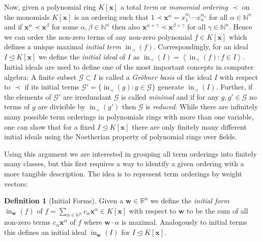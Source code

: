 \documentclass[
  paper=a4,
  titlepage,
  bibliography=totoc,
  listof=totoc,
  pagesize=pdftex
]{scrartcl}
\numberwithin{figure}{section}
\numberwithin{equation}{section}
\numberwithin{table}{section}
\newcommand*\setR{\mathds{R}}
\newcommand*\setN{\mathds{N}}
\newcommand*\ideal[1]{\left\langle #1 \right\rangle}
\let\vec\mathbf
\let\idealof\trianglelefteq
\DeclareMathOperator{\initial}{in}
\theoremstyle{definition}
\newtheorem{definition}{Definition}
\numberwithin{definition}{section}
\begin{document}
Now, given a polynomial ring $K[\vec x]$ a total \emph{term} or \emph{monomial ordering}
$\prec$ on the monomials $K[\vec x]$ is an ordering such that $1 \prec \vec x^\alpha =
x_1^{\alpha_1}\cdots x_n^{\alpha_n}$ for all $\alpha \in \setN^n$ and if $\vec x^\alpha
\prec \vec x^\beta$ for some $\alpha, \beta \in \setN^n$ then also $\vec x^{\alpha+\gamma}
\prec \vec x^{\beta+\gamma}$ for all $\gamma \in \setN^n$. Hence we can order the non-zero
terms of any non-zero polynomial $f \in K[\vec x]$ which defines a unique maximal
\emph{initial term} $\initial_\prec(f)$. Correspondingly, for an ideal $I \idealof K[\vec
x]$ we define the \emph{initial ideal} of $I$ as $\initial_\prec(I) = \ideal{\initial_\prec(f)
: f \in I}$. Initial ideals are used to define one of the most important concepts in
computer algebra: A finite subset $\mathcal G \subset I$ is called a \emph{Gröbner basis}
of the ideal $I$ with respect to $\prec$ if its initial terms $\mathcal G' = \{
\initial_\prec(g) : g \in \mathcal G \}$ generate $\initial_\prec(I)$. Further, if the
elements of $\mathcal G'$ are irredundant $\mathcal G$ is called \emph{minimal} and if for
any $g, g' \in \mathcal G$ no terms of $g$ are divisible by $\initial_\prec(g')$ then
$\mathcal G$ is \emph{reduced}. While there are infinitely many possible term orderings in
polynomials rings with more than one variable, one can show that for a fixed $I \idealof
K[\vec x]$ there are only finitely many different initial ideals using the Noetherian
property of polynomial rings over fields.

Using this argument we are interested in grouping all term orderings into finitely many
classes, but this first requires a way to identify a given ordering with a more tangible
description. The idea is to represent term orderings by weight vectors:

\begin{definition}[Initial Forms]
  Given a $\vec w \in \setR^n$ we define the \emph{initial form} $\initial_{\vec w}(f)$ of
  $f = \sum_{\alpha\in\setN^n} c_\alpha \vec x^\alpha \in K[\vec x]$ with respect to $\vec
  w$ to be the sum of all non-zero terms $c_\alpha \vec x^\alpha$ of $f$ where $\vec
  w\cdot \alpha$ is maximal. Analogously to initial terms this defines an initial ideal
  $\initial_{\vec w}(I)$ for $I \idealof K[\vec x]$.
  \label{def:initFormG}
\end{definition}
\end{document}
